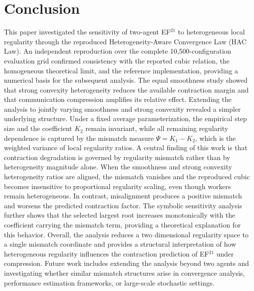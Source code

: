 \documentclass[mathematics,article,submit,moreauthors]{Definitions/mdpi}
\begin{document}
\section{Conclusion} 
This paper investigated the sensitivity of two-agent EF$^{21}$ to heterogeneous local regularity through the reproduced Heterogeneity-Aware Convergence Law (HAC Law). An independent reproduction over the complete 10,500-configuration evaluation grid confirmed consistency with the reported cubic relation, the homogeneous theoretical limit, and the reference implementation, providing a numerical basis for the subsequent analysis. The equal smoothness study showed that strong convexity heterogeneity reduces the available contraction margin and that communication compression amplifies its relative effect. Extending the analysis to jointly varying smoothness and strong convexity revealed a simpler underlying structure. Under a fixed average parameterization, the empirical step size and the coefficient \(K_2\) remain invariant, while all remaining regularity dependence is captured by the mismatch measure \(\Psi=K_1-K_2\), which is the weighted variance of local regularity ratios. A central finding of this work is that contraction degradation is governed by regularity mismatch rather than by heterogeneity magnitude alone. When the smoothness and strong convexity heterogeneity ratios are aligned, the mismatch vanishes and the reproduced cubic becomes insensitive to proportional regularity scaling, even though workers remain heterogeneous. In contrast, misalignment produces a positive mismatch and worsens the predicted contraction factor. The symbolic sensitivity analysis further shows that the selected largest root increases monotonically with the coefficient carrying the mismatch term, providing a theoretical explanation for this behavior. Overall, the analysis reduces a two dimensional regularity space to a single mismatch coordinate and provides a structural interpretation of how heterogeneous regularity influences the contraction prediction of EF$^{21}$ under compression. Future work includes extending the analysis beyond two agents and investigating whether similar mismatch structures arise in convergence analysis, performance estimation frameworks, or large-scale stochastic settings.

\end{document}
